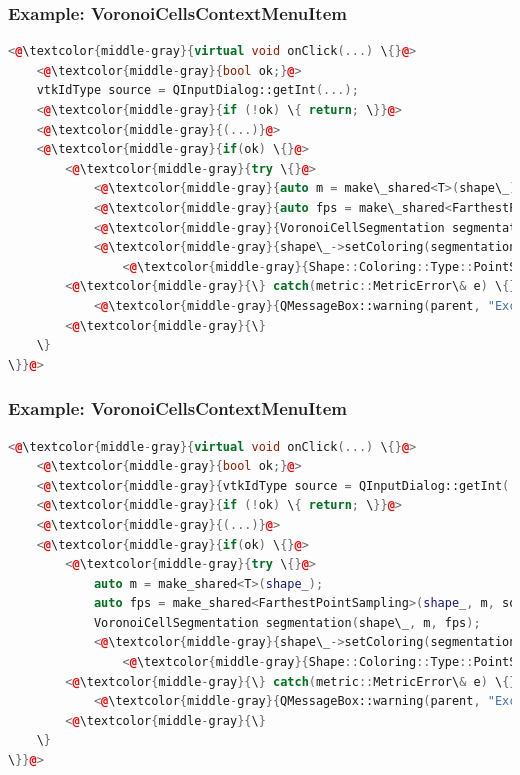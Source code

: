 \documentclass[compress]{beamer}
\begin{document}
\begin{frame}[fragile]
  \frametitle{Example: VoronoiCellsContextMenuItem}
  
\begin{lstlisting}[language=C++, keywordstyle=\color{blue},
                stringstyle=\color{red},
                commentstyle=\color{green}, numbers=none]
<@\textcolor{middle-gray}{virtual void onClick(...) \{}@>
    <@\textcolor{middle-gray}{bool ok;}@>
    vtkIdType source = QInputDialog::getInt(...);
    <@\textcolor{middle-gray}{if (!ok) \{ return; \}}@>
    <@\textcolor{middle-gray}{(...)}@>
    <@\textcolor{middle-gray}{if(ok) \{}@>
        <@\textcolor{middle-gray}{try \{}@>
            <@\textcolor{middle-gray}{auto m = make\_shared<T>(shape\_);}@>
            <@\textcolor{middle-gray}{auto fps = make\_shared<FarthestPointSampling>(shape\_, m, source, numberOfSegments);}@>
            <@\textcolor{middle-gray}{VoronoiCellSegmentation segmentation(shape\_, m, fps);}@>
            <@\textcolor{middle-gray}{shape\_->setColoring(segmentation.getSegments(), }@>
            	<@\textcolor{middle-gray}{Shape::Coloring::Type::PointSegmentation);}@>
        <@\textcolor{middle-gray}{\} catch(metric::MetricError\& e) \{}@>
            <@\textcolor{middle-gray}{QMessageBox::warning(parent, "Exception", e.what());}@>
        <@\textcolor{middle-gray}{\}
    \}
\}}@>
\end{lstlisting}
  
\end{frame}

\begin{frame}[fragile]
  \frametitle{Example: VoronoiCellsContextMenuItem}
  
\begin{lstlisting}[language=C++, keywordstyle=\color{blue},
                stringstyle=\color{red},
                commentstyle=\color{green}, numbers=none]
<@\textcolor{middle-gray}{virtual void onClick(...) \{}@>
    <@\textcolor{middle-gray}{bool ok;}@>
    <@\textcolor{middle-gray}{vtkIdType source = QInputDialog::getInt(...);}@>
    <@\textcolor{middle-gray}{if (!ok) \{ return; \}}@>
    <@\textcolor{middle-gray}{(...)}@>
    <@\textcolor{middle-gray}{if(ok) \{}@>
        <@\textcolor{middle-gray}{try \{}@>
            auto m = make_shared<T>(shape_);
            auto fps = make_shared<FarthestPointSampling>(shape_, m, source, numberOfSegments);
            VoronoiCellSegmentation segmentation(shape\_, m, fps);
            <@\textcolor{middle-gray}{shape\_->setColoring(segmentation.getSegments(), }@>
            	<@\textcolor{middle-gray}{Shape::Coloring::Type::PointSegmentation);}@>
        <@\textcolor{middle-gray}{\} catch(metric::MetricError\& e) \{}@>
            <@\textcolor{middle-gray}{QMessageBox::warning(parent, "Exception", e.what());}@>
        <@\textcolor{middle-gray}{\}
    \}
\}}@>
\end{lstlisting}
  
\end{frame}
\end{document}
